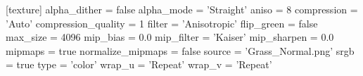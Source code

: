 [texture]
alpha_dither = false
alpha_mode = 'Straight'
aniso = 8
compression = 'Auto'
compression_quality = 1
filter = 'Anisotropic'
flip_green = false
max_size = 4096
mip_bias = 0.0
mip_filter = 'Kaiser'
mip_sharpen = 0.0
mipmaps = true
normalize_mipmaps = false
source = 'Grass_Normal.png'
srgb = true
type = 'color'
wrap_u = 'Repeat'
wrap_v = 'Repeat'